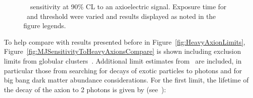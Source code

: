 			\begin{figure}
				\centering
				\def\figheight{0.41\textheight}
				\caption[\MJ~\minmod~sensitivity at 90\% CL to an axioelectric signal]{
				\MJ~\minmod~sensitivity at 90\% CL to an axioelectric signal.  Exposure time for \hthree~and threshold were varied and results displayed as noted
				in the figure legends.}
				\label{fig:MJSensitivityToAxion}
			\end{figure}	
				
	To help compare with results presented before in Figure~\ref{fig:HeavyAxionLimits}, Figure~\ref{fig:MJSensitivityToHeavyAxionsCompare} is shown including exclusion limits from %
	globular clusters~\cite{Raffelt95}.  Additional limit estimates from~\cite{Pospelov:2008jk} are included, in particular those from searching for decays of exotic particles to photons and for big bang dark matter abundance considerations.  For the first limit, the lifetime of the decay of the axion to 2 photons is given by (see~\cite{Pospelov:2008jk}):
	
